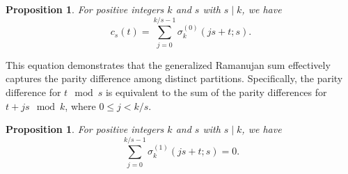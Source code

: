 \documentclass[12pt]{article}
\newtheorem{prop}[thm]{Proposition}%
\begin{document}
\begin{prop}
For positive integers \( k \) and \( s \) with \( s \mid k \), we have
\[
c_{s}(t) = \sum_{j=0}^{k/s-1} \sigma_{k}^{(0)}(js + t; s).
\]
\end{prop}

This equation demonstrates that the generalized Ramanujan sum effectively captures the parity difference among distinct partitions. Specifically, the parity difference for \( t \mod s \) is equivalent to the sum of the parity differences for \( t + js \mod k \), where \(0\leq j <k/s.\) 

\begin{prop}
For positive integers \( k \) and \( s \) with \( s \mid k \), we have
\[
 \sum_{j=0}^{k/s-1} \sigma_{k}^{(1)}(js + t; s)=0.
\]    
\end{prop}
\end{document}
